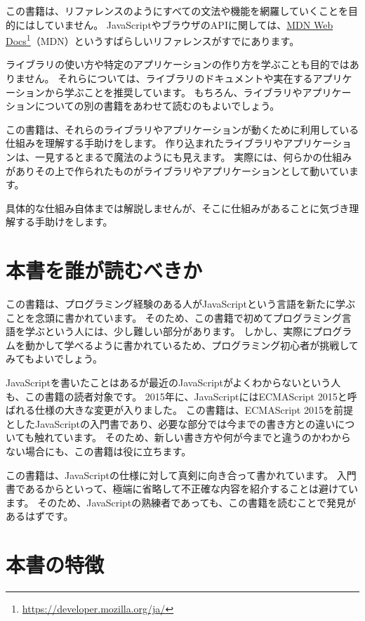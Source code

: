 この書籍は、リファレンスのようにすべての文法や機能を網羅していくことを目的にはしていません。
JavaScriptやブラウザのAPIに関しては、\href{https://developer.mozilla.org/ja/}{MDN Web Docs}\footnote{\url{https://developer.mozilla.org/ja/}}（MDN）というすばらしいリファレンスがすでにあります。

ライブラリの使い方や特定のアプリケーションの作り方を学ぶことも目的ではありません。
それらについては、ライブラリのドキュメントや実在するアプリケーションから学ぶことを推奨しています。
もちろん、ライブラリやアプリケーションについての別の書籍をあわせて読むのもよいでしょう。

この書籍は、それらのライブラリやアプリケーションが動くために利用している仕組みを理解する手助けをします。
作り込まれたライブラリやアプリケーションは、一見するとまるで魔法のようにも見えます。
実際には、何らかの仕組みがありその上で作られたものがライブラリやアプリケーションとして動いています。

具体的な仕組み自体までは解説しませんが、そこに仕組みがあることに気づき理解する手助けをします。

\hypertarget{who-read}{%
\section*{本書を誰が読むべきか}\label{who-read}}

この書籍は、プログラミング経験のある人がJavaScriptという言語を新たに学ぶことを念頭に書かれています。
そのため、この書籍で初めてプログラミング言語を学ぶという人には、少し難しい部分があります。
しかし、実際にプログラムを動かして学べるように書かれているため、プログラミング初心者が挑戦してみてもよいでしょう。

JavaScriptを書いたことはあるが最近のJavaScriptがよくわからないという人も、この書籍の読者対象です。
2015年に、JavaScriptにはECMAScript 2015と呼ばれる仕様の大きな変更が入りました。
この書籍は、ECMAScript 2015を前提としたJavaScriptの入門書であり、必要な部分では今までの書き方との違いについても触れています。
そのため、新しい書き方や何が今までと違うのかわからない場合にも、この書籍は役に立ちます。

この書籍は、JavaScriptの仕様に対して真剣に向き合って書かれています。
入門書であるからといって、極端に省略して不正確な内容を紹介することは避けています。
そのため、JavaScriptの熟練者であっても、この書籍を読むことで発見があるはずです。

\hypertarget{features}{%
\section*{本書の特徴}\label{features}}

